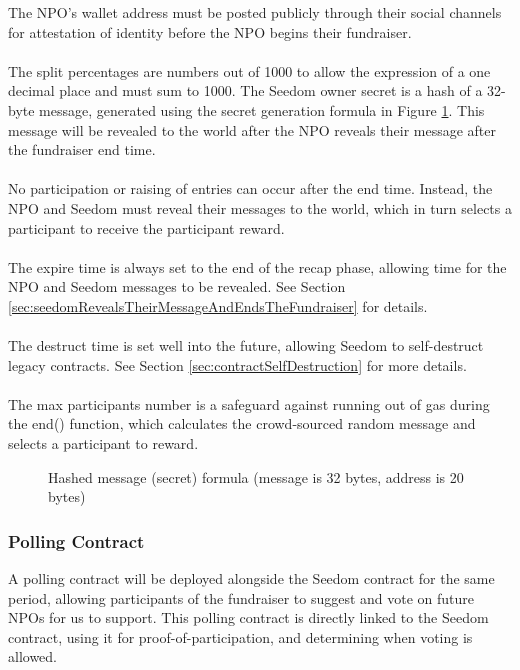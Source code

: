 \documentclass[11pt]{article}
\begin{document}
The NPO's wallet address must be posted publicly through their social channels for attestation of identity before the NPO begins their fundraiser.\\\\
The split percentages are numbers out of 1000 to allow the expression of a one decimal place and must sum to 1000. The Seedom owner secret is a hash of a 32-byte message, generated using the secret generation formula in Figure \ref{figure:secretGenerationFormula}. This message will be revealed to the world after the NPO reveals their message after the fundraiser end time.\\\\
No participation or raising of entries can occur after the end time. Instead, the NPO and Seedom must reveal their messages to the world, which in turn selects a participant to receive the participant reward.\\\\
The expire time is always set to the end of the recap phase, allowing time for the NPO and Seedom messages to be revealed. See Section \ref{sec:seedomRevealsTheirMessageAndEndsTheFundraiser} for details.\\\\
The destruct time is set well into the future, allowing Seedom to self-destruct legacy contracts. See Section \ref{sec:contractSelfDestruction} for more details.\\\\
The max participants number is a safeguard against running out of gas during the end() function, which calculates the crowd-sourced random message and selects a participant to reward.

\begin{figure}[H]
\begin{center}
\caption{Hashed message (secret) formula (message is 32 bytes, address is 20 bytes)}
\label{figure:secretGenerationFormula}
\end{center}
\end{figure}

\subsubsection{Polling Contract}

A polling contract will be deployed alongside the Seedom contract for the same period, allowing participants of the fundraiser to suggest and vote on future NPOs for us to support. This polling contract is directly linked to the Seedom contract, using it for proof-of-participation, and determining when voting is allowed.
\end{document}
